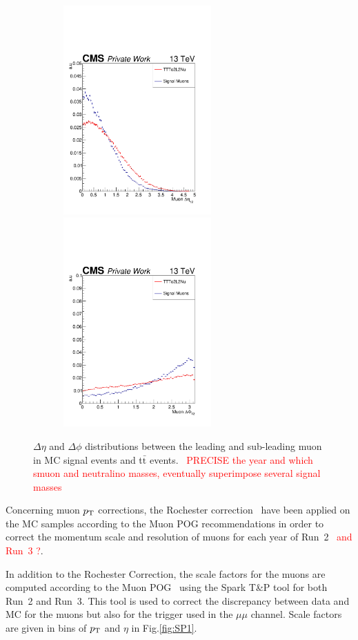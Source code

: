\documentclass{cernatlasnote}
\newcommand{\ttbar}{t$\bar{\text{t}}$\xspace}
\newcommand{\pt}{$p_{\text T}$\xspace}
\begin{document}
\begin{appendices}
\begin{figure}[ht]
\centering
\includegraphics[height=8cm, width=8cm, trim= 0cm 0cm 0cm 0.cm,clip]{images/Muon/MuonMuondEta.pdf}\includegraphics[height=8cm, width=8cm, trim= 0cm 0cm 0cm 0.cm,clip]{images/Muon/MuonMuondPhi.pdf}
\caption{\label{fig:MuondR} $\Delta\eta$ and $\Delta\phi$ distributions between the leading and sub-leading muon in MC signal events and \ttbar events.
~\textcolor{red}{PRECISE the year and which smuon and neutralino masses, eventually superimpose several signal masses}
}
\end{figure}
\FloatBarrier

Concerning muon \pt corrections, the Rochester correction~\cite{ROCCOR} have been applied on the MC samples according to the Muon POG recommendations in order to correct the momentum scale and resolution of muons for each year of Run~2 ~\textcolor{red}{and Run~3 ?}.

In addition to the Rochester Correction, the scale factors for the muons are computed according to the Muon POG~\cite{MuonSpark1,MuonSpark2} using the Spark T\&P tool for both Run~2 and Run~3. This tool is used to correct the discrepancy between data and MC for the muons but also for the trigger used in the $\mu\mu$ channel. Scale factors are given in bins of \pt and $\eta$ in Fig.\ref{fig:SP1}.
\label{Spark}


\end{appendices}
\end{document}
